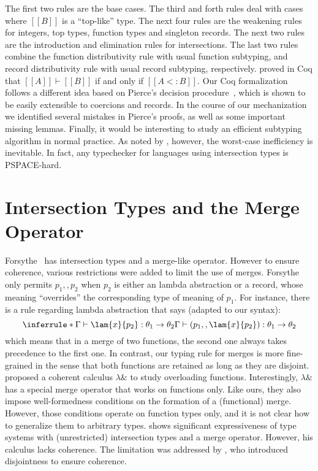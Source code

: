 The first two rules are the base cases. The third and forth rules deal with
cases where $[[B]]$ is a ``top-like'' type. The next four rules are the
weakening rules for integers, top types, function types and singleton records.
The next two rules are the introduction and elimination rules for intersections.
The last two rules combine the function distributivity rule with usual function
subtyping, and record distributivity rule with usual record subtyping,
respectively. \citeauthor{Laurent18b} proved in Coq that $[[ A ]] \vdash [[B]]$
if and only if $[[ A <: B ]]$. %
Our Coq formalization follows a different idea based on Pierce's decision
procedure~\citep{pierce1989decision}, which is shown to be easily extensible to
coercions and records. In the course of our mechanization we identified several
mistakes in Pierce's proofs, as well as some important missing lemmas. Finally,
it would be interesting to study an efficient subtyping algorithm in normal
practice. As noted by \citet{reynolds1997design}, however, the worst-case
inefficiency is inevitable. In fact, any typechecker for languages using
intersection types is PSPACE-hard.




\section{Intersection Types and the Merge Operator}

Forsythe~\citep{reynolds1988preliminary} has intersection types and a merge-like
operator. However to ensure coherence, various restrictions were added to limit
the use of merges. Forsythe only permits $p_1 ,, p_2$ when $p_2$ is either an
lambda abstraction or a record, whose meaning ``overrides'' the corresponding
type of meaning of $p_1$. For instance, there is a rule regarding lambda
abstraction that says (adapted to our syntax):
\[
  \inferrule*{ \Gamma \vdash \lam{x}{p_2} : \theta_1 \rightarrow \theta_2  }{ \Gamma \vdash (p_1 ,, \lam{x}{p_2}) : \theta_1 \rightarrow \theta_2  }
\]
which means that in a merge of two functions, the second one always takes
precedence to the first one. In contrast, our typing rule for merges is more
fine-grained in the sense that both functions are retained as long as they are
disjoint. \citet{Castagna_1992} proposed a coherent calculus $\lambda \&$ to
study overloading functions. Interestingly, $\lambda \&$ has a special merge
operator that works on functions only. Like ours, they also impose
well-formedness conditions on the formation of a (functional) merge. However,
those conditions operate on function types only, and it is not clear how to
generalize them to arbitrary types. \citet{dunfield2014elaborating} shows
significant expressiveness of type systems with (unrestricted) intersection
types and a merge operator. However, his calculus lacks coherence. The limitation
was addressed by \citet{oliveira2016disjoint}, who introduced disjointness to
ensure coherence.

